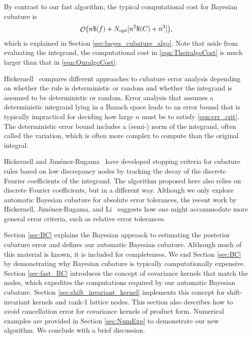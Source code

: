 \documentclass[twocolumn]{svjour3}          %
\DeclareMathOperator{\Order}{{\mathcal O}}
\newcommand{\opt}{{\textup{opt}}}
\begin{document}
By contrast to our fast algorithm, the typical computational cost for Bayesian cubature is
\begin{equation} \label{eqn:TheiralgoCost}
    \Order\bigl(n \$(f) + N_{\opt}[n^2\$(C) + n^3] \bigr),
\end{equation} 
which is explained in Section \ref{sec:bayes_cubature_algo}. Note that aside from evaluating the integrand, the computational cost in \eqref{eqn:TheiralgoCost} is much larger than that in \eqref{eqn:OuralgoCost}.  

Hickernell~\cite{Hic17a} compares different approaches to cubature error analysis depending on whether the rule is deterministic or random and whether the integrand is assumed to be deterministic or random.  Error analysis that assumes a deterministic integrand lying in a Banach space leads to an error bound that is typically impractical for deciding how large $n$ must be to satisfy \eqref{eqn:err_crit}.  The deterministic error bound includes a (semi-) norm of the integrand, often called the variation, which is often more complex to compute than the original integral.

Hickernell and Jim\'enez-Rugama~\cite{HicJim16a,JimHic16a} have developed stopping criteria for cubature rules based on low discrepancy nodes by tracking the decay of the discrete Fourier coefficients of the integrand.  The algorithm proposed here also relies on discrete Fourier coefficients, but in a different way.  Although we only explore automatic Bayesian cubature for absolute error tolerances, the recent work by Hickernell, Jim\'enez-Rugama, and Li~\cite{HicEtal17a} suggests how one might accommodate more general error criteria, such as relative error tolerances.

Section \ref{sec:BC} explains the Bayesian approach to estimating the posterior cubature error and defines our automatic Bayesian cubature. Although much of this material is known, it is included for completeness.  We end Section \ref{sec:BC}  by demonstrating why Bayesian cubature is typically computationally expensive.
Section \ref{sec:fast_BC}  introduces the concept of covariance kernels that match the nodes, which expedites the computations required by our automatic Bayesian cubature. 
Section \ref{sec:shift_invariant_kernel} implements this concept for shift-invariant kernels and rank-1 lattice nodes.  This section also describes how to avoid cancellation error for covariance kernels of product form.  Numerical examples are provided in Section \ref{sec:NumExp} to demonstrate our new algorithm.  We conclude with a brief discussion.
\end{document}
